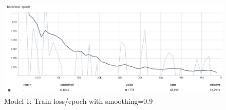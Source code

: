 \begin{figure}[h]
    \centering
    \includegraphics[width=1\linewidth]{5_Results/figures/model-1-train-loss-epoch-smooth.png}
    \caption{Model 1: Train loss/epoch with smoothing=0.9}
    \label{fig:mod1-train-loss-epoch-smooth}
\end{figure}


